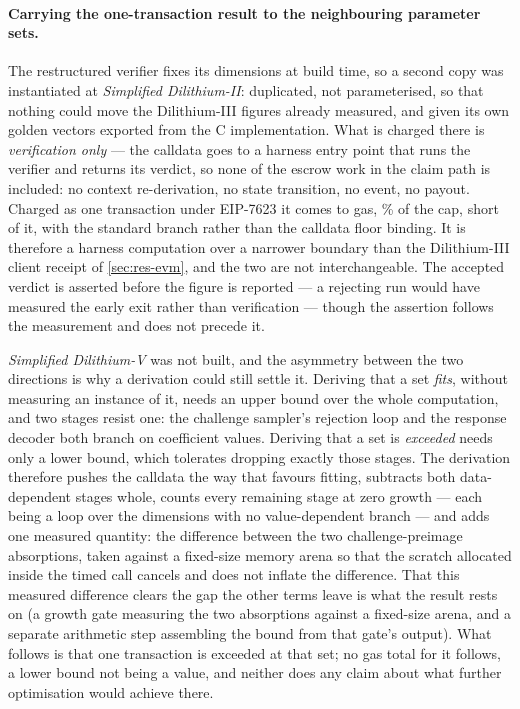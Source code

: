 \paragraph{Carrying the one-transaction result to the neighbouring parameter sets.}
The restructured verifier fixes its dimensions at build time, so a second copy was
instantiated at \emph{Simplified Dilithium-II}: duplicated, not parameterised, so
that nothing could move the Dilithium-III figures already measured, and given its own
golden vectors exported from the C implementation. What is charged there is
\emph{verification only} --- the calldata goes to a harness entry point that runs the
verifier and returns its verdict, so none of the escrow work in the claim path is
included: no context re-derivation, no state transition, no event, no payout. Charged as
one transaction under EIP-7623 it comes to \gasDTwoTotal{} gas, \gasDTwoCapPct\% of the
cap, \gasDTwoHeadroom{} short of it, with the standard branch rather than the calldata
floor binding. It is therefore a harness computation over
a narrower boundary than the Dilithium-III client receipt of \cref{sec:res-evm}, and the
two are not interchangeable. The accepted verdict is asserted before the figure is
reported --- a rejecting run would have measured the early exit rather than verification
--- though the assertion follows the measurement and does not precede it.

\emph{Simplified Dilithium-V} was not built, and the asymmetry between the two directions
is why a derivation could still settle it. Deriving that a set \emph{fits}, without measuring an instance of it, needs an upper bound over the whole computation, and two
stages resist one: the challenge sampler's rejection loop and the response decoder both
branch on coefficient values. Deriving that a set is \emph{exceeded} needs only a lower
bound, which tolerates dropping exactly those stages. The derivation therefore pushes the
calldata the way that favours fitting, subtracts both data-dependent stages whole, counts
every remaining stage at zero growth --- each being a loop over the dimensions with no
value-dependent branch --- and adds one measured quantity: the difference between the two
challenge-preimage absorptions, taken against a fixed-size memory arena so that the
scratch allocated inside the timed call cancels and does not inflate the difference. That
this measured difference clears the gap the other terms leave is what the result rests on
(a growth gate measuring the two absorptions against a fixed-size arena, and a separate
arithmetic step assembling the bound from that gate's output). What follows is that one
transaction is exceeded at
that set; no gas total for it follows, a lower bound not being a value, and neither does
any claim about what further optimisation would achieve there.

